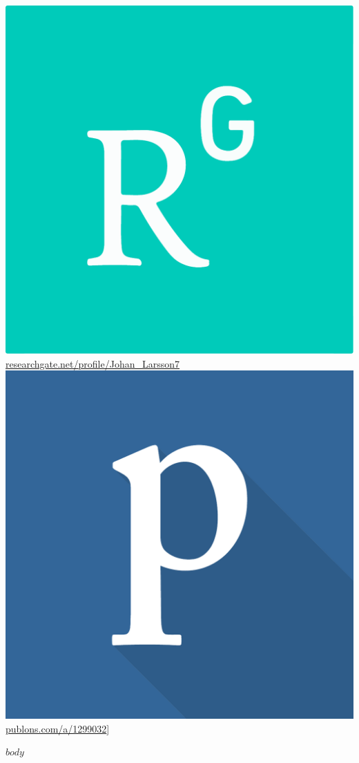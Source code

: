 \documentclass[
  DIV=calc,
  parskip=half,
  headsepline=true
]{scrartcl}
\newlength{\capheight}
\begin{document}
\begin{minipage}{0.5\textwidth}
\href{https://www.researchgate.net/profile/Johan_Larsson7}{\includegraphics[height=\capheight]{assets/researchgate.pdf} researchgate.net/profile/Johan\_Larsson7}\\
\href{http://publons.com/a/1299032}{\includegraphics[height=\capheight]{assets/publons.pdf} publons.com/a/1299032}]
\end{minipage}

\tableofcontents

$body$
\end{document}
